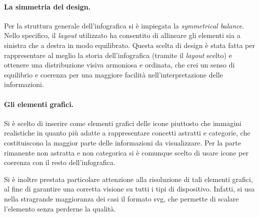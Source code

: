 \paragraph{La simmetria del design.} Per la struttura generale dell'infografica si è impiegata la \emph{symmetrical balance}.
Nello specifico, il \emph{layout} utilizzato ha consentito di allineare gli elementi sia a sinistra che a destra in modo equilibrato. 
Questa scelta di design è stata fatta per rappresentare al meglio la storia dell'infografica (tramite il \emph{layout} scelto) e ottenere una distribuzione visiva armoniosa e ordinata,
che crei un senso di equilibrio e coerenza per una maggiore facilità nell'interpretazione delle informazioni.

\paragraph{Gli elementi grafici.} Si è scelto di inserire come elementi grafici delle icone piuttosto che immagini realistiche in quanto più adatte a rappresentare concetti astratti e categorie, che costituiscono la maggior parte 
delle informazioni da visualizzare. Per la parte rimanente non astratta e non categorica si è comunque scelto di usare icone per coerenza con il resto dell'infografica.

Si è inoltre prestata particolare attenzione alla risoluzione di tali elementi grafici, al fine di garantire una corretta visione su tutti i tipi di dispositivo.
Infatti, si usa nella stragrande maggioranza dei casi il formato \gls{svg}, che permette di scalare l'elemento senza perderne la qualità.

